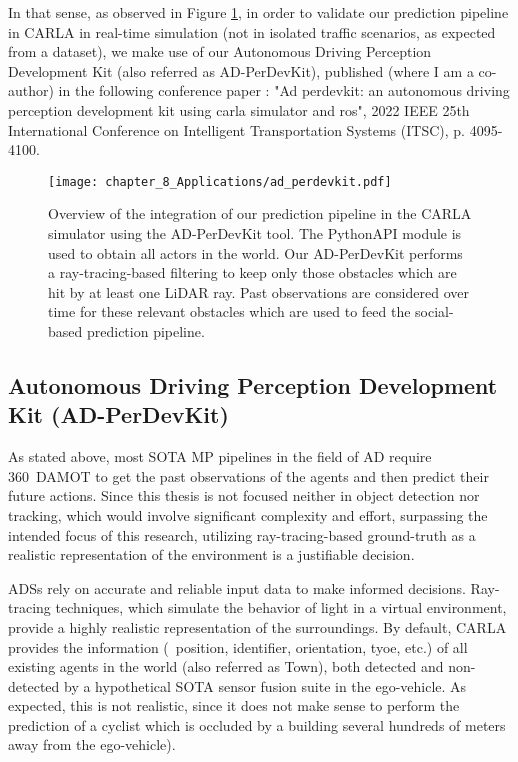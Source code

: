 In that sense, as observed in Figure \ref{fig:chapter_8_Applications/ad_perdevkit}, in order to validate our prediction pipeline in \ac{CARLA} in real-time simulation (not in isolated traffic scenarios, as expected from a dataset), we make use of our Autonomous Driving Perception Development Kit (also referred as AD-PerDevKit), published (where I am a co-author) in the following conference paper \cite{de2022ad}: "Ad perdevkit: an autonomous driving perception development kit using carla simulator and ros", 2022 IEEE 25th International Conference on Intelligent Transportation Systems (ITSC), p. 4095-4100.  

\begin{figure}[h]
	\centering
	\texttt{[image: chapter\_8\_Applications/ad\_perdevkit.pdf]}
	\captionsetup{justification=justified}
	\caption[Overview of the integration of our prediction pipeline in the \ac{CARLA} simulator using the AD-PerDevKit tool]{Overview of the integration of our prediction pipeline in the \ac{CARLA} simulator using the AD-PerDevKit tool. The PythonAPI module is used to obtain all actors in the world. Our \ac{AD-PerDevKit} performs a ray-tracing-based filtering to keep only those obstacles which are hit by at least one \ac{LiDAR} ray. Past observations are considered over time for these relevant obstacles which are used to feed the social-based prediction pipeline.}
	\label{fig:chapter_8_Applications/ad_perdevkit}
\end{figure}

\subsection{Autonomous Driving Perception Development Kit (AD-PerDevKit)}
\label{subsec:8_ad_perdevkit}

As stated above, most \ac{SOTA} \ac{MP} pipelines in the field of \ac{AD} require 360\degree~\ac{DAMOT} to get the past observations of the agents and then predict their future actions. Since this thesis is not focused neither in object detection nor tracking, which would involve significant complexity and effort, surpassing the intended focus of this research, utilizing ray-tracing-based ground-truth as a realistic representation of the environment is a justifiable decision.

\acp{ADS} rely on accurate and reliable input data to make informed decisions. Ray-tracing techniques, which simulate the behavior of light in a virtual environment, provide a highly realistic representation of the surroundings. By default, \ac{CARLA} provides the information (\ie \ position, identifier, orientation, tyoe, etc.) of all existing agents in the world (also referred as Town), both detected and non-detected by a hypothetical \ac{SOTA} sensor fusion suite in the ego-vehicle. As expected, this is not realistic, since it does not make sense to perform the prediction of a cyclist which is occluded by a building several hundreds of meters away from the ego-vehicle).

